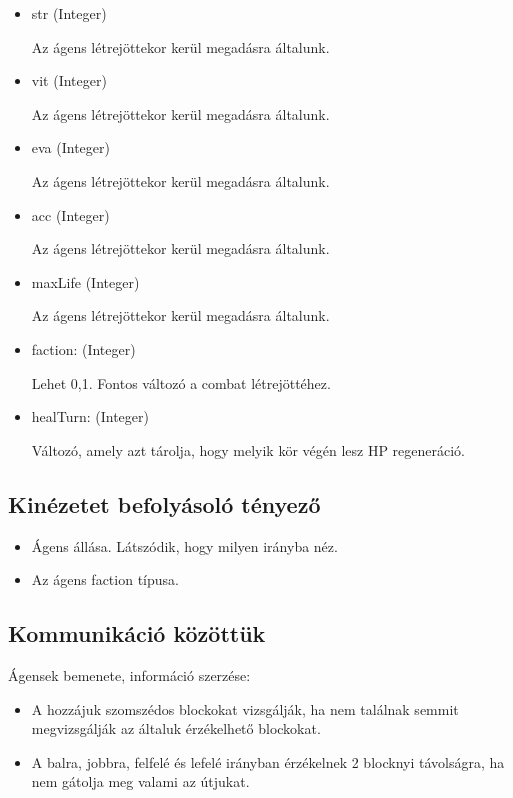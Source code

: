 
\begin{itemize}
    
    \item str (Integer)
    
    Az ágens létrejöttekor kerül megadásra általunk.
    \item vit (Integer)
    
    Az ágens létrejöttekor kerül megadásra általunk.
    \item eva (Integer)
    
    Az ágens létrejöttekor kerül megadásra általunk.
    \item acc (Integer)
    
    Az ágens létrejöttekor kerül megadásra általunk.
    \item maxLife (Integer)
    
    Az ágens létrejöttekor kerül megadásra általunk.
    \item faction: (Integer)
    
    Lehet 0,1. Fontos változó a combat létrejöttéhez.
    \item healTurn: (Integer)
    
    Változó, amely azt tárolja, hogy melyik kör végén lesz HP regeneráció.
\end{itemize}

\subsection{Kinézetet befolyásoló tényező}

\begin{itemize}
    \item Ágens állása. Látszódik, hogy milyen irányba néz.
    \item Az ágens faction típusa.
\end{itemize}

\subsection{Kommunikáció közöttük}

Ágensek bemenete, információ szerzése:
\begin{itemize}
    \item A hozzájuk szomszédos blockokat vizsgálják, ha nem találnak semmit megvizsgálják az általuk érzékelhető blockokat.
    \item A balra, jobbra, felfelé és lefelé irányban érzékelnek 2 blocknyi távolságra, ha nem gátolja meg valami az útjukat.
\end{itemize}

